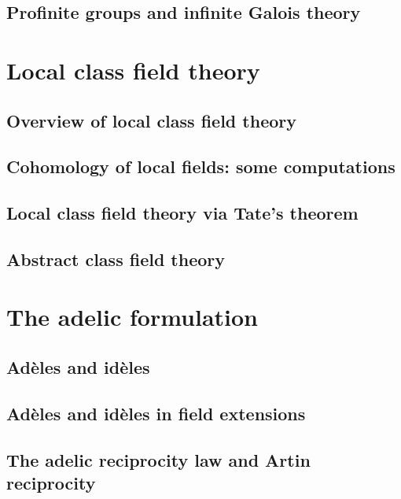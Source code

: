 \documentclass{amsbook}
\begin{document}
\chapter{Profinite groups and infinite Galois theory}


\part{Local class field theory}

\chapter{Overview of local class field theory}


\chapter{Cohomology of local fields: some computations}
\label{chap:localcomp}


\chapter{Local class field theory via Tate's theorem}


\chapter{Abstract class field theory}
\label{chap:abstractcft}


\part{The adelic formulation}

\chapter{Ad\`eles and id\`eles}


\chapter{Ad\`eles and id\`eles in field extensions}


\chapter{The adelic reciprocity law and Artin reciprocity}

\end{document}
